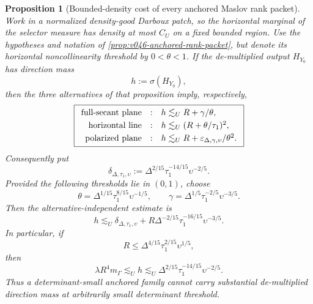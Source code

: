 \documentclass[10pt]{article}
\newtheorem{proposition}[theorem]{Proposition}
\begin{document}
\begin{proposition}[Bounded-density cost of every anchored Maslov rank packet]
\label{prop:v050-anchored-packet-density-cost}
Work in a normalized density-good Darboux patch, so the horizontal marginal of the selector measure
has density at most \(C_U\) on a fixed bounded region.  Use the hypotheses and notation of
\cref{prop:v046-anchored-rank-packet}, but denote its horizontal noncollinearity threshold by
\(0<\theta<1\).  If the de-multiplied output \(H_{Y_0}\) has direction mass
\[
h:=\sigma(H_{Y_0}),
\]
then the three alternatives of that proposition imply, respectively,
\begin{equation}
\label{eq:v050-three-packet-density-costs}
\boxed{
\begin{array}{rcl}
\textnormal{full-secant plane}&:&
h\lesssim_U R+\gamma/\theta,\\[1mm]
\textnormal{horizontal line}&:&
h\lesssim_U(R+\theta/\tau_1)^2,\\[1mm]
\textnormal{polarized plane}&:&
h\lesssim_U
R+\varepsilon_{\Delta,\gamma,\upsilon}/\theta^2.
\end{array}
}
\end{equation}
Consequently put
\[
\delta_{\Delta,\tau_1,\upsilon}
:=
\Delta^{2/15}\tau_1^{-14/15}\upsilon^{-2/5}.
\]
Provided the following thresholds lie in \((0,1)\), choose
\begin{equation}
\label{eq:v050-optimized-rank-thresholds}
\theta=\Delta^{1/15}\tau_1^{8/15}\upsilon^{-1/5},
\qquad
\gamma=\Delta^{1/5}\tau_1^{-2/5}\upsilon^{-3/5}.
\end{equation}
Then the alternative-independent estimate is
\begin{equation}
\label{eq:v050-optimized-packet-cost}
\boxed{
h
\lesssim_U
\delta_{\Delta,\tau_1,\upsilon}
+
R\Delta^{-2/15}\tau_1^{-16/15}\upsilon^{-3/5}.
}
\end{equation}
In particular, if
\[
R
\le
\Delta^{4/15}\tau_1^{2/15}\upsilon^{1/5},
\]
then
\begin{equation}
\label{eq:v050-rank-packet-mass-cap}
\boxed{
\lambda R^4m_\Gamma
\lesssim_U
h
\lesssim_U
\Delta^{2/15}\tau_1^{-14/15}\upsilon^{-2/5}.
}
\end{equation}
Thus a determinant-small anchored family cannot carry substantial de-multiplied direction mass at
arbitrarily small determinant threshold.
\end{proposition}
\end{document}
